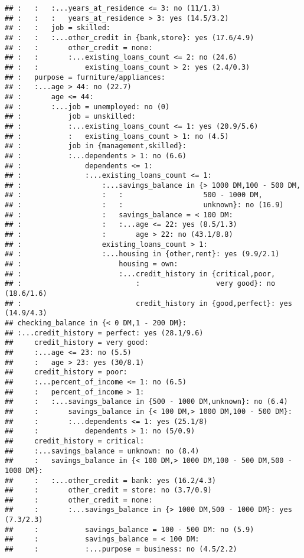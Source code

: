 \documentclass[
]{article}
\begin{document}
\begin{verbatim}
## :   :   :...years_at_residence <= 3: no (11/1.3)
## :   :   :   years_at_residence > 3: yes (14.5/3.2)
## :   :   job = skilled:
## :   :   :...other_credit in {bank,store}: yes (17.6/4.9)
## :   :       other_credit = none:
## :   :       :...existing_loans_count <= 2: no (24.6)
## :   :           existing_loans_count > 2: yes (2.4/0.3)
## :   purpose = furniture/appliances:
## :   :...age > 44: no (22.7)
## :       age <= 44:
## :       :...job = unemployed: no (0)
## :           job = unskilled:
## :           :...existing_loans_count <= 1: yes (20.9/5.6)
## :           :   existing_loans_count > 1: no (4.5)
## :           job in {management,skilled}:
## :           :...dependents > 1: no (6.6)
## :               dependents <= 1:
## :               :...existing_loans_count <= 1:
## :                   :...savings_balance in {> 1000 DM,100 - 500 DM,
## :                   :   :                   500 - 1000 DM,
## :                   :   :                   unknown}: no (16.9)
## :                   :   savings_balance = < 100 DM:
## :                   :   :...age <= 22: yes (8.5/1.3)
## :                   :       age > 22: no (43.1/8.8)
## :                   existing_loans_count > 1:
## :                   :...housing in {other,rent}: yes (9.9/2.1)
## :                       housing = own:
## :                       :...credit_history in {critical,poor,
## :                           :                  very good}: no (18.6/1.6)
## :                           credit_history in {good,perfect}: yes (14.9/4.3)
## checking_balance in {< 0 DM,1 - 200 DM}:
## :...credit_history = perfect: yes (28.1/9.6)
##     credit_history = very good:
##     :...age <= 23: no (5.5)
##     :   age > 23: yes (30/8.1)
##     credit_history = poor:
##     :...percent_of_income <= 1: no (6.5)
##     :   percent_of_income > 1:
##     :   :...savings_balance in {500 - 1000 DM,unknown}: no (6.4)
##     :       savings_balance in {< 100 DM,> 1000 DM,100 - 500 DM}:
##     :       :...dependents <= 1: yes (25.1/8)
##     :           dependents > 1: no (5/0.9)
##     credit_history = critical:
##     :...savings_balance = unknown: no (8.4)
##     :   savings_balance in {< 100 DM,> 1000 DM,100 - 500 DM,500 - 1000 DM}:
##     :   :...other_credit = bank: yes (16.2/4.3)
##     :       other_credit = store: no (3.7/0.9)
##     :       other_credit = none:
##     :       :...savings_balance in {> 1000 DM,500 - 1000 DM}: yes (7.3/2.3)
##     :           savings_balance = 100 - 500 DM: no (5.9)
##     :           savings_balance = < 100 DM:
##     :           :...purpose = business: no (4.5/2.2)

\end{verbatim}
\end{document}
